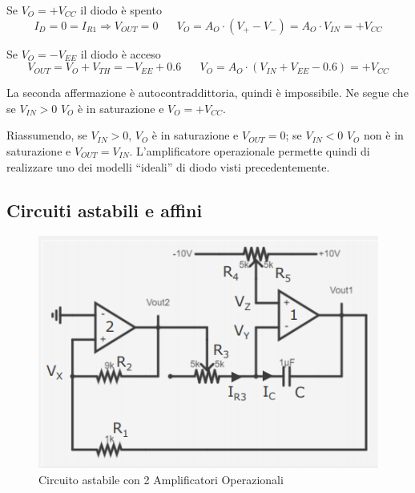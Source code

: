 \documentclass{article}
\begin{document}
\begin{enumerate}
\begin{itemize}
\vspace{2mm}

Se $V_O = +V_{CC}$ il diodo è spento 
\[ I_D = 0 = I_{R1} \Rightarrow V_{OUT} = 0 \;\;\;\;\;\; V_O = A_O \cdot (V_+ - V_-) = A_O \cdot V_{IN} = +V_{CC}\]

Se $V_O = -V_{EE}$ il diodo è acceso 
\[V_{OUT} = V_O + V_{TH} = -V_{EE} + 0.6 \;\;\;\;\;\; V_O = A_O \cdot (V_{IN} + V_{EE} - 0.6) = +V_{CC}\]

La seconda affermazione è autocontraddittoria, quindi è impossibile. Ne segue che se $V_{IN} > 0$ $V_O$ è in saturazione e $V_O = +V_{CC}$.

\end{itemize}
\end{enumerate}

\vspace{5mm}

Riassumendo, se $V_{IN} > 0$, $V_O$ è in saturazione e $V_{OUT} = 0$; se $V_{IN} < 0$ $V_O$ non è in saturazione e $V_{OUT} = V_{IN}$. L'amplificatore operazionale permette quindi di realizzare uno dei modelli ``ideali'' di diodo visti precedentemente.

\clearpage













\subsection{Circuiti astabili e affini}

\begin{figure}[h]
  \centering
  \includegraphics[scale=0.7]{IM_circuito_astabile}
  \caption{Circuito astabile con 2 Amplificatori Operazionali}
  \label{Schema_circuito_astabile}
\end{figure}
\end{document}
